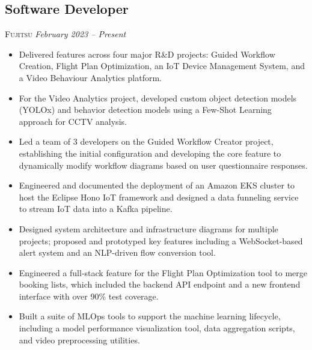 \documentclass[10pt, a4paper]{article} %
\begin{document}
\subsection*{Software Developer}
\textsc{Fujitsu} \textit{February 2023 – Present}
\begin{itemize}
    \itemsep -0.5em %
    \item Delivered features across four major R\&D projects: Guided Workflow Creation, Flight Plan Optimization, an IoT Device Management System, and a Video Behaviour Analytics platform.
    \item For the Video Analytics project, developed custom object detection models (YOLOx) and behavior detection models using a Few-Shot Learning approach for CCTV analysis.
    \item Led a team of 3 developers on the Guided Workflow Creator project, establishing the initial configuration and developing the core feature to dynamically modify workflow diagrams based on user questionnaire responses.
    \item Engineered and documented the deployment of an Amazon EKS cluster to host the Eclipse Hono IoT framework and designed a data funneling service to stream IoT data into a Kafka pipeline.
    \item Designed system architecture and infrastructure diagrams for multiple projects; proposed and prototyped key features including a WebSocket-based alert system and an NLP-driven flow conversion tool.
    \item Engineered a full-stack feature for the Flight Plan Optimization tool to merge booking lists, which included the backend API endpoint and a new frontend interface with over 90\% test coverage.
    \item Built a suite of MLOps tools to support the machine learning lifecycle, including a model performance visualization tool, data aggregation scripts, and video preprocessing utilities.
\end{itemize}
\end{document}
